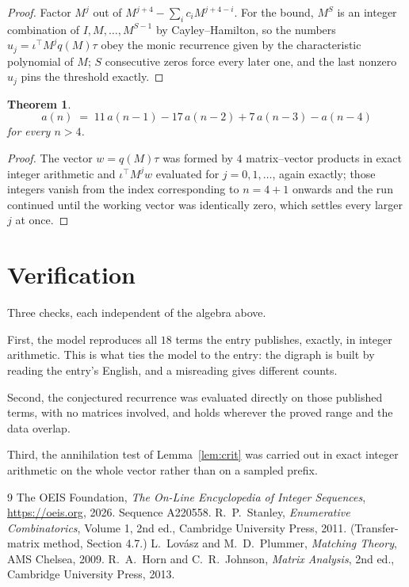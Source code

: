 \documentclass[11pt,a4paper]{article}
\theoremstyle{plain}
\newtheorem{theorem}{Theorem}
\theoremstyle{definition}
\begin{document}
\begin{proof}
Factor $M^{j}$ out of $M^{j+4}-\sum_ic_iM^{j+4-i}$. For the bound, $M^{S}$
is an integer combination of $I,M,\dots,M^{S-1}$ by Cayley--Hamilton, so the numbers
$u_j=\iota^{\!\top}M^{j}q(M)\tau$ obey the monic recurrence given by the characteristic
polynomial of $M$; $S$ consecutive zeros force every later one, and the last nonzero $u_j$
pins the threshold exactly.
\end{proof}

\begin{theorem}
\[
a(n)\;=\;11\,a(n-1) - 17\,a(n-2) + 7\,a(n-3) - a(n-4)
\]
for every $n>4$.
\end{theorem}

\begin{proof}
The vector $w=q(M)\tau$ was formed by $4$ matrix--vector products in exact integer
arithmetic and $\iota^{\!\top}M^{j}w$ evaluated for $j=0,1,\dots$, again exactly; those
integers vanish from the index corresponding to $n=4+1$ onwards and the run continued
until the working vector was identically zero, which settles every larger $j$ at once.
\end{proof}

\section{Verification}

Three checks, each independent of the algebra above.

First, the model reproduces all $18$ terms the entry publishes, exactly, in integer
arithmetic. This is what ties the model to the entry: the digraph is built by reading the
entry's English, and a misreading gives different counts.

Second, the conjectured recurrence was evaluated directly on those published terms, with no
matrices involved, and holds wherever the proved range and the data overlap.

Third, the annihilation test of Lemma~\ref{lem:crit} was carried out in exact integer
arithmetic on the whole vector rather than on a sampled prefix.

\begin{thebibliography}{9}
 The OEIS Foundation, \emph{The On-Line Encyclopedia of Integer
Sequences}, \url{https://oeis.org}, 2026. Sequence A220558.
 R.~P.~Stanley, \emph{Enumerative Combinatorics}, Volume 1, 2nd ed.,
Cambridge University Press, 2011. (Transfer-matrix method, Section 4.7.)
 L.~Lov\'asz and M.~D.~Plummer, \emph{Matching Theory}, AMS Chelsea,
2009.
 R.~A.~Horn and C.~R.~Johnson, \emph{Matrix Analysis}, 2nd ed., Cambridge
University Press, 2013.
\end{thebibliography}
\end{document}
